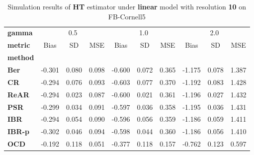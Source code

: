 \begin{table}
\centering
\caption{Simulation results of \textbf{HT} estimator under \textbf{linear} model with resolution \textbf{10} on FB-Cornell5}
\begin{tabular}{lccccccccc}
\toprule
\textbf{gamma} & \multicolumn{3}{c}{0.5} & \multicolumn{3}{c}{1.0} & \multicolumn{3}{c}{2.0} \\
\textbf{metric} &   Bias &     SD &    MSE &   Bias &     SD &    MSE &   Bias &     SD &    MSE \\
\textbf{method} &        &        &        &        &        &        &        &        &        \\
\midrule
\textbf{Ber} & -0.301 &  0.080 &  0.098 & -0.600 &  0.072 &  0.365 & -1.175 &  0.078 &  1.387 \\
\textbf{CR} & -0.294 &  0.076 &  0.093 & -0.603 &  0.077 &  0.370 & -1.192 &  0.083 &  1.428 \\
\textbf{ReAR} & -0.294 &  0.023 &  0.087 & -0.600 &  0.021 &  0.361 & -1.196 &  0.027 &  1.432 \\
\textbf{PSR} & -0.299 &  0.034 &  0.091 & -0.597 &  0.036 &  0.358 & -1.195 &  0.036 &  1.431 \\
\textbf{IBR} & -0.294 &  0.054 &  0.090 & -0.596 &  0.056 &  0.359 & -1.186 &  0.059 &  1.411 \\
\textbf{IBR-p} & -0.302 &  0.046 &  0.094 & -0.598 &  0.044 &  0.360 & -1.186 &  0.056 &  1.410 \\
\textbf{OCD} & -0.192 &  0.118 &  0.051 & -0.377 &  0.118 &  0.157 & -0.762 &  0.123 &  0.597 \\
\bottomrule
\end{tabular}
\end{table}
